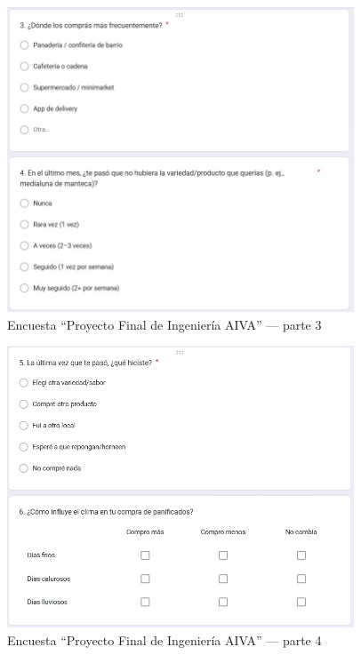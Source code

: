 \begin{figure}[p]
  \centering
  \includegraphics[width=0.92\textwidth]{images/encuesta_p3.png}
  \caption{Encuesta “Proyecto Final de Ingeniería AIVA” — parte 3}
  \label{fig:encuesta-aiva-3}
\end{figure}

\begin{figure}[p]
  \centering
  \includegraphics[width=0.92\textwidth]{images/encuesta_p4.png}
  \caption{Encuesta “Proyecto Final de Ingeniería AIVA” — parte 4}
  \label{fig:encuesta-aiva-4}
\end{figure}


